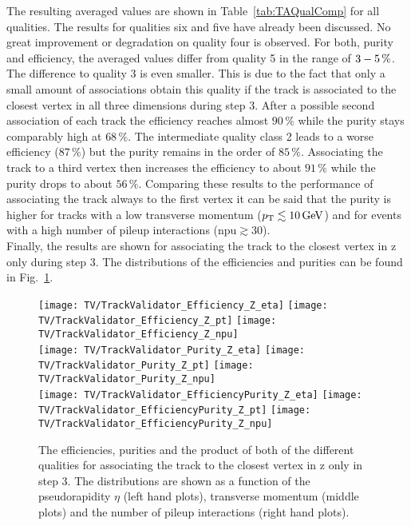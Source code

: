 The resulting averaged values are shown in Table~\ref{tab:TAQualComp} for all qualities. The results for qualities six and five have already been discussed. No great improvement or degradation on quality four is observed. For both, purity and efficiency, the averaged values differ from quality 5 in the range of $3\--{}5\,\%$. The difference to quality 3 is even smaller. This is due to the fact that only a small amount of associations obtain this quality if the track is associated to the closest vertex in all three dimensions during step 3. After a possible second association of each track the efficiency reaches almost $90\,\%$ while the purity stays comparably high at $68\,\%$. The intermediate quality class 2 leads to a worse efficiency ($87\,\%$) but the purity remains in the order of $85\,\%$. Associating the track to a third vertex then increases the efficiency to about $91\,\%$ while the purity drops to about $56\,\%$. Comparing these results to the performance of associating the track always to the first vertex it can be said that the purity is higher for tracks with a low transverse momentum ($p_{\mathrm{T}}{}\lesssim10\,\text{Ge\hspace{-.08em}V}$) and for events with a high number of pileup interactions ($\textrm{npu}\gtrsim30$). \\

Finally, the results are shown for associating the track to the closest vertex in z only during step 3. The distributions of the efficiencies and purities can be found in Fig.~\ref{plot:TASEFRDQZSignal}.

\begin{figure}[Ht]
    \centering
    \texttt{[image: TV/TrackValidator\_Efficiency\_Z\_eta]}
    \texttt{[image: TV/TrackValidator\_Efficiency\_Z\_pt]}
    \texttt{[image: TV/TrackValidator\_Efficiency\_Z\_npu]}
    \\
    \texttt{[image: TV/TrackValidator\_Purity\_Z\_eta]}
    \texttt{[image: TV/TrackValidator\_Purity\_Z\_pt]}
    \texttt{[image: TV/TrackValidator\_Purity\_Z\_npu]}
    \\
    \texttt{[image: TV/TrackValidator\_EfficiencyPurity\_Z\_eta]}
    \texttt{[image: TV/TrackValidator\_EfficiencyPurity\_Z\_pt]}
    \texttt{[image: TV/TrackValidator\_EfficiencyPurity\_Z\_npu]}
    \caption[Efficiencies, purities and their product of the different qualities of the association map with associating the track to the closest vertex in z only in step 3]{The efficiencies, purities and the product of both of the different qualities for associating the track to the closest vertex in z only in step 3. The distributions are shown as a function of the pseudorapidity $\eta$ (left hand plots), transverse momentum (middle plots) and the number of pileup interactions (right hand plots). \label{plot:TASEFRDQZSignal}}
\end{figure}

